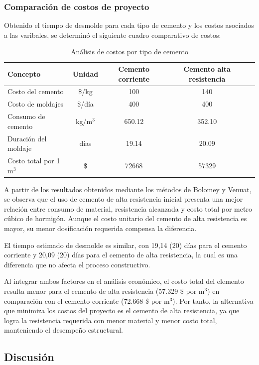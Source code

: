 \subsubsection*{Comparación de costos de proyecto}

Obtenido el tiempo de desmolde para cada tipo de cemento y los costos asociados a las varibales, se determinó el siguiente cuadro comparativo de costos:

\begin{table}[H]
\centering
\caption{Análisis de costos por tipo de cemento}
\renewcommand{\arraystretch}{1.1}
\small
\begin{tabular}{lcccc}
\hline
Concepto & Unidad & Cemento corriente & Cemento alta resistencia \\ \hline
Costo del cemento & \$/kg & 100 & 140 \\
Costo de moldajes & \$/día & 400 & 400 \\
Consumo de cemento & kg/m$^3$ & 650.12 & 352.10 \\
Duración del moldaje & días & 19.14 & 20.09 \\
Costo total por 1 m$^3$ & \$ & 72668 & 57329 \\ \hline
\end{tabular}
\end{table}

A partir de los resultados obtenidos mediante los métodos de Bolomey y Venuat, se observa que el uso de cemento de alta resistencia inicial presenta una mejor relación entre consumo de material, resistencia alcanzada y costo total por metro cúbico de hormigón.  
Aunque el costo unitario del cemento de alta resistencia es mayor, su menor dosificación requerida compensa la diferencia.  

El tiempo estimado de desmolde es similar, con 19,14 (20) días para el cemento corriente y 20,09 (20) días para el cemento de alta resistencia, la cual es una diferencia que no afecta el proceso constructivo.  

Al integrar ambos factores en el análisis económico, el costo total del elemento resulta menor para el cemento de alta resistencia (57.329 \$ por m$^3$) en comparación con el cemento corriente (72.668 \$ por m$^3$).  
Por tanto, la alternativa que minimiza los costos del proyecto es el cemento de alta resistencia, ya que logra la resistencia requerida con menor material y menor costo total, manteniendo el desempeño estructural.

\subsection*{Discusión}

